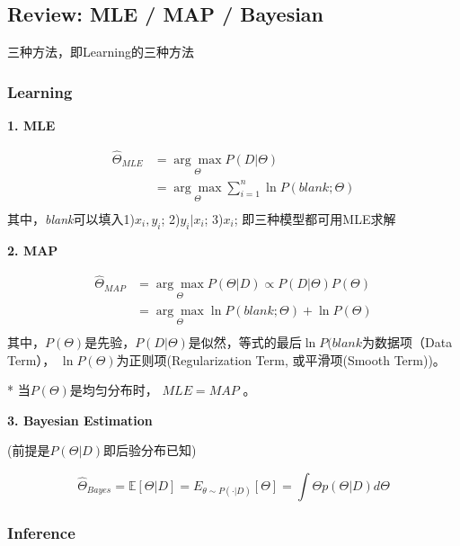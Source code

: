 \documentclass[UTF8]{ctexart}
\numberwithin{equation}{section}
\begin{document}
\dotfill

\subsection{Review: MLE / MAP / Bayesian}
三种方法，即Learning的三种方法
\subsubsection*{\textbf{Learning}} 

\textbf{1. MLE }


\begin{equation*}
    \begin{aligned}
        \hat \Theta_{MLE} &= \underset{\Theta}{\arg \max} P(D | \Theta)     \\
        &= \underset{\Theta}{\arg \max} \sum_{i=1}^n \ln P( \textit{blank} ; \Theta) \\
    \end{aligned}
\end{equation*}
其中，\textit{blank}可以填入1)$x_i, y_i$; 2)$y_i|x_i$; 3)$x_i$; 即三种模型都可用MLE求解

\textbf{2. MAP}

\begin{equation*}
    \begin{aligned}
        \hat \Theta_{MAP} &= \underset{\Theta}{\arg \max} P(\Theta | D)  \propto P(D|\Theta)P(\Theta)   \\
        &= \underset{\Theta}{\arg \max} \ln P( \textit{blank} ; \Theta) + \ln P(\Theta)\\
    \end{aligned}
\end{equation*}
其中，$P(\Theta)$是先验，$P(D|\Theta)$是似然，等式的最后$\ln P( \textit{blank} $为数据项（Data Term）， 
$\ln P(\Theta)$为正则项(Regularization Term, 或平滑项(Smooth Term))。

* 当$P(\Theta)$是均匀分布时， $MLE=MAP$ 。


\textbf{3. Bayesian Estimation}

(前提是$P(\Theta | D)$即后验分布已知)

\begin{equation*}
    \hat \Theta_{Bayes} = \mathbb{E}[\Theta | D ] = E_{\theta \sim P(\cdot | D)}[\Theta] = \int \Theta p(\Theta | D) d\Theta
\end{equation*}


\subsubsection*{\textbf{Inference}}
\end{document}
